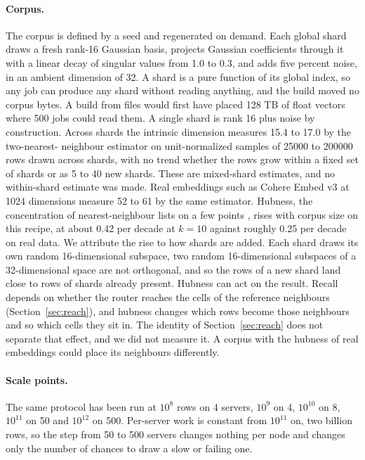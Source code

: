 \documentclass[sigconf, nonacm]{acmart}
\begin{document}
\paragraph{Corpus.} The corpus is defined by a seed and regenerated on demand. Each global shard
draws a fresh rank-16 Gaussian basis, projects Gaussian coefficients through it with a linear decay
of singular values from 1.0 to 0.3, and adds five percent noise, in an ambient dimension of 32. A
shard is a pure function of its global index, so any job can produce any shard without reading
anything, and the build moved no corpus bytes. A build from files would first have placed 128 TB of
float vectors where 500 jobs could read them. A single shard is rank 16 plus noise by
construction. Across shards the intrinsic dimension measures 15.4 to 17.0 by the two-nearest-
neighbour estimator \cite{facco2017twonn} on unit-normalized samples of 25000 to 200000 rows drawn
across shards, with no trend whether the rows grow within a fixed set of shards or as 5 to 40 new
shards. These are mixed-shard estimates, and no within-shard estimate was made. Real embeddings such as Cohere Embed v3 at
1024 dimensions measure 52 to 61 by the same estimator. Hubness, the concentration of
nearest-neighbour lists on a few points \cite{radovanovic2010hubs}, rises with corpus size on this
recipe, at about 0.42 per decade at $k=10$ against roughly 0.25 per decade on real data. We
attribute the rise to how shards are added. Each shard draws its own random 16-dimensional subspace,
two random 16-dimensional subspaces of a 32-dimensional space are not orthogonal, and so the rows of
a new shard land close to rows of shards already present. Hubness can act on the result. Recall
depends on whether the router reaches the cells of the reference neighbours
(Section~\ref{sec:reach}), and hubness changes which rows become those neighbours and so which cells
they sit in. The identity of Section~\ref{sec:reach} does not separate that effect, and we did not
measure it. A corpus with the hubness of real embeddings could place its neighbours differently.

\paragraph{Scale points.} The same protocol has been run at $10^{8}$ rows on 4 servers, $10^{9}$
on 4, $10^{10}$ on 8, $10^{11}$ on 50 and $10^{12}$ on 500. Per-server work is constant from
$10^{11}$ on, two billion rows, so the step from 50 to 500 servers changes nothing per node and
changes only the number of chances to draw a slow or failing one.
\end{document}

